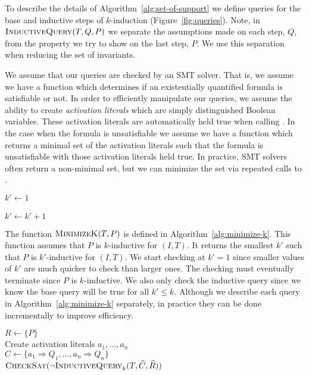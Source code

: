 To describe the details of Algorithm~\ref{alg:set-of-support} we
define queries for the base and inductive steps of $k$-induction
(Figure~\ref{fig:queries}). Note, in $\textsc{InductiveQuery}(T, Q, P)$ we separate the
assumptions made on each step, $Q$, from the property we try to show
on the last step, $P$. We use this separation when reducing the set of
invariants.

We assume that our queries are checked by an SMT solver. That is, we
assume we have a function \checksat which determines if an
existentially quantified formula is satisfiable or not. In order to
efficiently manipulate our queries, we assume the ability to create
{\em activation literals} which are simply distinguished Boolean
variables. These activation literals are automatically held true when
calling \checksat. In the case when the formula is unsatisfiable we
assume we have a function \unsatcore which returns a minimal set of
the activation literals such that the formula is unsatisfiable with
those activation literals held true. In practice, SMT solvers often
return a non-minimal set, but we can minimize the set via repeated
calls to \checksat.

\begin{algorithm}[t]
  $k' \leftarrow 1$ \\
   {
     {
       \\
    }
    $k' \leftarrow k' + 1$ \\
  }
\caption{$\mink(T, P)$}
\label{alg:minimize-k}
\end{algorithm}

The function $\mink(T, P)$ is defined in
Algorithm~\ref{alg:minimize-k}. This function assumes that $P$ is
$k$-inductive for $(I, T)$. It returns the smallest $k'$ such that $P$
is $k'$-inductive for $(I, T)$. We start checking at $k' = 1$ since
smaller values of $k'$ are much quicker to check than larger ones. The
checking must eventually terminate since $P$ is $k$-inductive. We also
only check the inductive query since we know the base query will be
true for all $k' \leq k$. Although we describe each query in
Algorithm~\ref{alg:minimize-k} separately, in practice they can be done
incrementally to improve efficiency.

\begin{algorithm}[t]
  $R \leftarrow \{P\}$ \\
  Create activation literals $a_1, \ldots, a_n$ \\
  $C \leftarrow \{a_1 \Rightarrow Q_1, \ldots, a_n \Rightarrow Q_n\}$ \\
   {
    $\textsc{CheckSat}(\neg\textsc{InductiveQuery}_k(T, \widehat C, \widehat R))$ \\
  }
\caption{$\reduceinv_k(T, \{Q_1, \ldots, Q_n\}, P)$}
\label{alg:reduce-invariants}
\end{algorithm}

